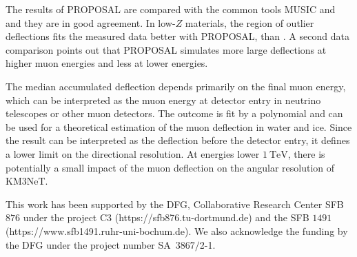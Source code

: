 The results of PROPOSAL are compared with the common tools MUSIC and 
 and they are in good agreement. In low-$Z$ materials, the region of outlier 
deflections fits the measured data better with PROPOSAL, than . 
A second data comparison points out that PROPOSAL simulates more 
large deflections at higher muon energies and less at lower 
energies.

The median accumulated deflection depends primarily on the final muon energy, which can be interpreted as the muon energy at detector entry 
in neutrino telescopes or other muon detectors.
The outcome is fit by a polynomial and can be used for 
a theoretical estimation of the muon deflection in water and ice.
Since the result can be interpreted as the deflection before the detector entry, it defines a lower limit on the directional resolution.
At energies lower $\SI{1}{\tera\electronvolt}$, there is potentially a small impact of the muon deflection on the angular 
resolution of KM3NeT.


\begin{acknowledgement}
  This work has been supported by the DFG, Collaborative Research Center SFB $876$
  under the project C3 
  (https://sfb876.tu-dortmund.de) and the SFB $1491$ (https://www.sfb1491.ruhr-uni-bochum.de).
  We also acknowledge the funding by the DFG under the project number SA~$3867/$2-1.
\end{acknowledgement}


\printbibliography




